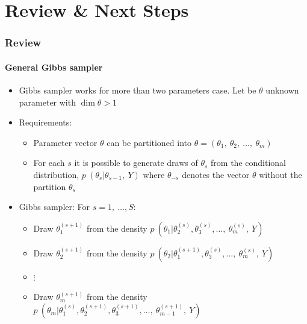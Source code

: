 \documentclass[
  shownotes,
  xcolor={svgnames},
  hyperref={colorlinks,citecolor=DarkBlue,linkcolor=DarkRed,urlcolor=DarkBlue}
  , aspectratio=169]{beamer}
\begin{document}
\section{Review \& Next Steps}
\begin{frame}[fragile]
\frametitle{Review} 
\framesubtitle{General Gibbs sampler}


\begin{itemize}
\item Gibbs sampler works for more than two parameters case. Let be $\theta$ unknown parameter with $\dim{\theta > 1}$



\item Requirements:
    \begin{itemize}
        \item Parameter vector $\theta$ can be partitioned into $\theta =  (\theta_{1},\ \theta_{2},\ \ldots,\ \theta_{m} )$
        \item For each $s$ it is possible to generate draws of $\theta_{s}$ from the conditional distribution, $p\ (\theta_{s}|\theta_{s - 1},\ Y)$ where $\theta_{- s}$ denotes the vector $\theta$ without the partition $\theta_{s}$
    \end{itemize}
    \item Gibbs sampler: For $s = 1,\ \ldots, S:$
    
    \begin{itemize}
        \item Draw $\theta_{1}^{(s + 1)}$ from the density $p\ (\theta_{1}|\theta_{2}^{\left( s \right)},\theta_{3}^{\left( s \right)},\ldots,\ \theta_{m}^{\left( s \right)},\ Y)\ $

        \item Draw $\theta_{2}^{(s + 1)}$ from the density $p\ (\theta_{2}|\theta_{1}^{\left( s+1 \right)},\theta_{3}^{\left( s \right)},\ldots,\ \theta_{m}^{\left( s \right)},\ Y)\ $

        \item $\vdots$

        \item Draw $\theta_{m}^{(s + 1)}$ from the density
        $p\ (\theta_{m}|\theta_{1}^{\left( s \right)},\theta_{2}^{\left( s+1 \right)},\theta_{3}^{\left( s+1 \right)},\ldots,\ \theta_{m - 1}^{\left( s + 1 \right)},\ Y)\ $
    \end{itemize}

\end{itemize}




\end{frame}
\end{document}
